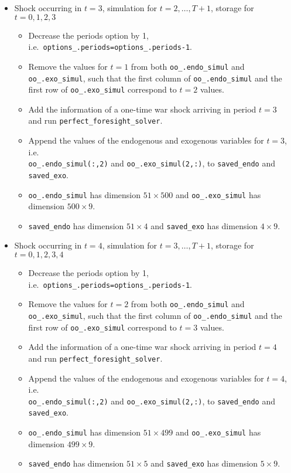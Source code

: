 \documentclass[a4paper]{scrartcl}
\begin{document}
\begin{enumerate}
\begin{itemize}
  \item
  Shock occurring in \(t=3\), simulation for \(t=2,\ldots ,T+1\), storage for \(t=0,1,2,3\)
  \begin{itemize}
    \item
    Decrease the periods option by 1, i.e.\ \texttt{options{\_}.periods=options{\_}.periods-1}.
    \item
    Remove the values for \(t=1\) from both \texttt{oo{\_}.endo{\_}simul} and \texttt{oo{\_}.exo{\_}simul},
      such that the first column of \texttt{oo{\_}.endo{\_}simul}
      and the first row of \texttt{oo{\_}.exo{\_}simul} correspond to \(t=2\) values.
    \item
    Add the information of a one-time war shock arriving in period \(t=3\) \\
      and run \texttt{perfect{\_}foresight{\_}solver}.
    \item
    Append the values of the endogenous and exogenous variables for \(t=3\), i.e.\\
      \texttt{oo{\_}.endo{\_}simul{(:,2)}} and \texttt{oo{\_}.exo{\_}simul{(2,:)}},
      to \texttt{saved{\_}endo} and \texttt{saved{\_}exo}.
    \item
    \texttt{oo{\_}.endo{\_}simul} has dimension \(51 \times 500\) and
    \texttt{oo{\_}.exo{\_}simul} has dimension \(500 \times 9\).
    \item
    \texttt{saved{\_}endo} has dimension \(51 \times 4\) and
    \texttt{saved{\_}exo} has dimension \(4 \times 9\).
  \end{itemize}

  \item
  Shock occurring in \(t=4\), simulation for \(t=3,\ldots ,T+1\), storage for \(t=0,1,2,3,4\)
  \begin{itemize}
    \item
    Decrease the periods option by 1, i.e.\ \texttt{options{\_}.periods=options{\_}.periods-1}.
    \item
    Remove the values for \(t=2\) from both \texttt{oo{\_}.endo{\_}simul} and \texttt{oo{\_}.exo{\_}simul},
      such that the first column of \texttt{oo{\_}.endo{\_}simul}
      and the first row of \texttt{oo{\_}.exo{\_}simul} correspond to \(t=3\) values.
    \item
    Add the information of a one-time war shock arriving in period \(t=4\) \\
      and run \texttt{perfect{\_}foresight{\_}solver}.
    \item
    Append the values of the endogenous and exogenous variables for \(t=4\), i.e.\\
      \texttt{oo{\_}.endo{\_}simul{(:,2)}} and \texttt{oo{\_}.exo{\_}simul{(2,:)}},
      to \texttt{saved{\_}endo} and \texttt{saved{\_}exo}.
    \item
    \texttt{oo{\_}.endo{\_}simul} has dimension \(51 \times 499\) and
    \texttt{oo{\_}.exo{\_}simul} has dimension \(499 \times 9\).
    \item
    \texttt{saved{\_}endo} has dimension \(51 \times 5\) and
    \texttt{saved{\_}exo} has dimension \(5 \times 9\).
  \end{itemize}


\end{itemize}
\end{enumerate}
\end{document}
